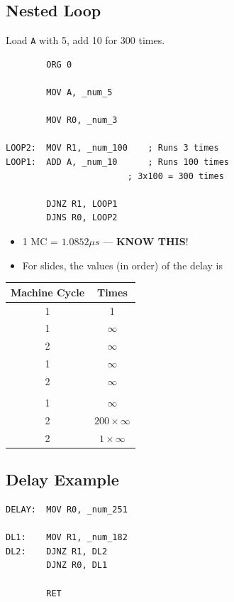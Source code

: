 \documentclass[12pt]{article}
\begin{document}
\subsection*{Nested Loop}
Load \texttt{A} with 5, add 10 for 300 times.

\begin{verbatim}
        ORG 0

        MOV A, _num_5

        MOV R0, _num_3

LOOP2:  MOV R1, _num_100    ; Runs 3 times
LOOP1:  ADD A, _num_10      ; Runs 100 times
                        ; 3x100 = 300 times

        DJNZ R1, LOOP1
        DJNS R0, LOOP2
\end{verbatim}

\begin{itemize}
    \item 1 MC = $1.0852 \mu s$ --- \textbf{KNOW THIS}!
    \item For slides, the values (in order) of the delay is
\end{itemize}

\begin{tabular}{|c|c|}
    \hline
    \textbf{Machine Cycle} & \textbf{Times} \\ \hline
    1 & 1 \\ \hline
    1 & $\infty$ \\  \hline
    2 & $\infty$ \\  \hline
    1 & $\infty$ \\  \hline
    2 & $\infty$ \\  \hline
      & \\ \hline
    1 & $\infty$ \\ \hline
    2 & $200 \times \infty$ \\ \hline
    2 & $1 \times \infty$ \\ \hline
\end{tabular}

\subsection*{Delay Example}
\begin{verbatim}
DELAY:  MOV R0, _num_251

DL1:    MOV R1, _num_182
DL2:    DJNZ R1, DL2
        DJNZ R0, DL1

        RET
\end{verbatim}
\end{document}
